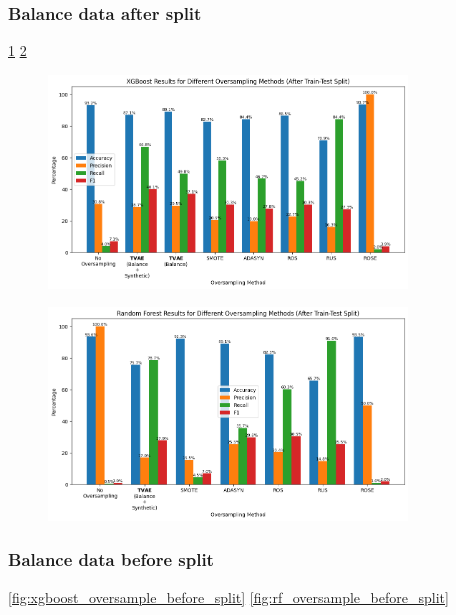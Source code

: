 \documentclass[twoside,11pt]{article}
\begin{document}
\subsubsection{Balance data after split} \label{sec:afterSplit}
\ref{fig:xgboost_oversample_after_split}
\ref{fig:rf_oversample_after_split}
\begin{figure}
  \centering
  \includegraphics[width=0.85\textwidth]{images/xgboost_oversample_after_split.png}
  \caption{}
  \label{fig:xgboost_oversample_after_split}
\end{figure}
\begin{figure}
  \centering
  \includegraphics[width=0.85\textwidth]{images/rf_oversample_after_split.png}
  \caption{}
  \label{fig:rf_oversample_after_split}
\end{figure}



\subsubsection{Balance data before split} \label{sec:beforeSplit}
\ref{fig:xgboost_oversample_before_split}
\ref{fig:rf_oversample_before_split}
\end{document}
